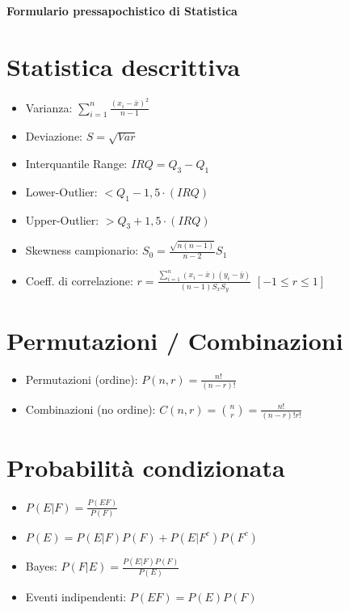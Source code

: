 \documentclass[a4paper,14pt,landscape]{extarticle}
\title{}
\author{}
\date{}
\begin{document}
\begin{center}
    \vspace{1cm}
    \textbf{\Large Formulario pressapochistico di Statistica}
    \vspace{1cm}
\end{center}

\begin{multicols*}{2}
    \section*{Statistica descrittiva}
    \begin{itemize}
        \item Varianza: $\sum_{i=1}^n \frac{(x_i - \bar{x})^2}{n-1}$
        \item Deviazione: $S = \sqrt{Var}$
        \item Interquantile Range: $IRQ = Q_3 - Q_1$
        \item Lower-Outlier: $< Q_1 - 1,5\cdot(IRQ)$
        \item Upper-Outlier: $> Q_3 + 1,5\cdot(IRQ)$
        \item Skewness campionario: $S_0 = \frac{\sqrt{n(n-1)}}{n-2}S_1$
        \item Coeff. di correlazione: $r = \frac{\sum_{i=1}^n (x_i-\bar{x})(y_i - \bar{y})}{(n-1)S_x S_y}$ $[-1 \le r \le 1]$
    \end{itemize}

    \section*{Permutazioni / Combinazioni}
    \begin{itemize}
        \item Permutazioni (ordine): $P(n,r) = \frac{n!}{(n-r)!}$
        \item Combinazioni (no ordine): $C(n,r) = \binom{n}{r} = \frac{n!}{(n-r)! r!}$
    \end{itemize}

    \section*{Probabilità condizionata}
    \begin{itemize}
        \item $P(E|F) = \frac{P(EF)}{P(F)}$
        \item $P(E) = P(E|F)P(F) + P(E|F^c)P(F^c)$
        \item Bayes: $P(F|E) = \frac{P(E|F)P(F)}{P(E)}$
        \item Eventi indipendenti: $P(EF) = P(E)P(F)$
    \end{itemize}


\end{multicols*}
\end{document}
